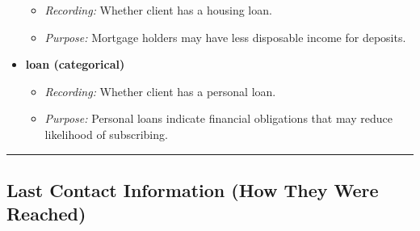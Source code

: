 \documentclass[
]{article}
\providecommand{\tightlist}{%
  \setlength{\itemsep}{0pt}\setlength{\parskip}{0pt}}
\begin{document}
\begin{itemize}
  \begin{itemize}
  \tightlist
  \item
    \emph{Recording:} Whether client has a housing loan.\\
  \item
    \emph{Purpose:} Mortgage holders may have less disposable income for
    deposits.
  \end{itemize}
\item
  \textbf{loan (categorical)}

  \begin{itemize}
  \tightlist
  \item
    \emph{Recording:} Whether client has a personal loan.\\
  \item
    \emph{Purpose:} Personal loans indicate financial obligations that
    may reduce likelihood of subscribing.
  \end{itemize}
\end{itemize}

\begin{center}\rule{0.5\linewidth}{0.5pt}\end{center}

\subsection{Last Contact Information (How They Were
Reached)}\label{last-contact-information-how-they-were-reached}
\end{document}
